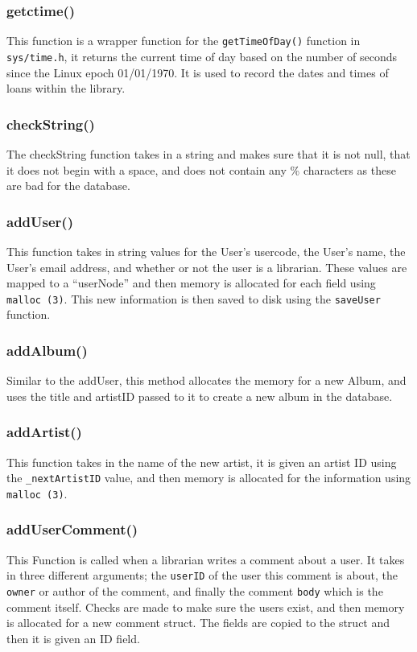 \documentclass{article}
\begin{document}
\subsubsection*{getctime()}
 This function is a wrapper function for the \verb|getTimeOfDay()| function in \verb|sys/time.h|, it returns the current time of day based on the number of seconds since the Linux epoch 01/01/1970. It is used to record the dates and times of loans within the library.

\subsubsection*{checkString()}
 The checkString function takes in a string and makes sure that it is not null, that it does not begin with a space,  and does not contain any \% characters as these are bad for the database.

\subsubsection*{addUser()}
This function takes in string values for the User's usercode, the User's name, the User's email address, and whether or not the user is a librarian.  These values are mapped to a ``userNode'' and then memory is allocated for each field using \verb|malloc (3)|. This new information is then saved to disk using the \verb|saveUser| function.

\subsubsection*{addAlbum()}
Similar to the addUser, this method allocates the memory for a new Album, and uses the title and artistID passed to it to create a new album in the database. 

\subsubsection*{addArtist()}
This function takes in the name of the new artist, it is given an artist ID using the \verb|_nextArtistID| value, and then memory is allocated for the information using \verb|malloc (3)|.

\subsubsection*{addUserComment()}
This Function is called when a librarian writes a comment about a user. It takes in three different arguments; the \verb|userID| of the user this comment is about, the \verb|owner| or author of the comment, and finally the comment \verb|body| which is the comment itself. Checks are made to make sure the users exist, and then memory is allocated for a new comment struct. The fields are copied to the struct and then it is given an ID field.
\end{document}
